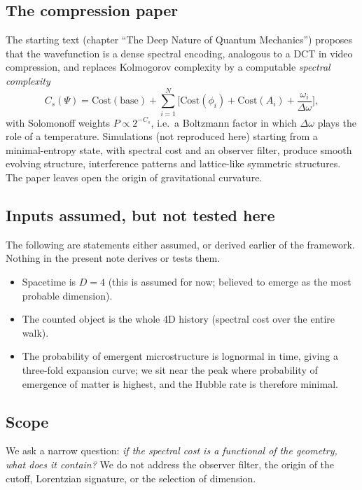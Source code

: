 \documentclass[11pt]{article}
\begin{document}
\subsection{The compression paper}
The starting text (chapter ``The Deep Nature of Quantum Mechanics'') proposes that the
wavefunction is a dense spectral encoding, analogous to a DCT in video compression, and replaces
Kolmogorov complexity by a computable \emph{spectral complexity}
\begin{equation}
C_s(\Psi)=\mathrm{Cost(base)}+\sum_{i=1}^{N}\Big[\mathrm{Cost}(\phi_i)+\mathrm{Cost}(A_i)
+\frac{\omega_i}{\Delta\omega}\Big],
\label{eq:Cs}
\end{equation}
with Solomonoff \cite{solomonoff1964} weights $P\propto 2^{-C_s}$, i.e.\ a Boltzmann factor in which $\Delta\omega$
plays the role of a temperature. Simulations (not reproduced here) starting from a minimal-entropy
state, with spectral cost and an observer filter, produce smooth evolving structure,
interference patterns and lattice-like symmetric structures. The paper leaves open the origin of
gravitational curvature.

\subsection{Inputs assumed, but not tested here}
The following are statements either assumed, or derived earlier of the framework.
Nothing in the present note derives or tests them.
\begin{itemize}
\item Spacetime is $D=4$ (this is assumed for now; believed to emerge as the most probable dimension).
\item The counted object is the whole 4D history (spectral cost over the entire walk).
\item The probability of emergent microstructure is lognormal in time, giving a three-fold
expansion curve; we sit near the peak where probability of emergence of matter is highest, and the Hubble rate is therefore minimal.
\end{itemize}

\subsection{Scope}
We ask a narrow question: \emph{if the spectral cost is a functional of the geometry, what does
it contain?} We do not address the observer filter, the origin of the cutoff, Lorentzian
signature, or the selection of dimension.
\end{document}
